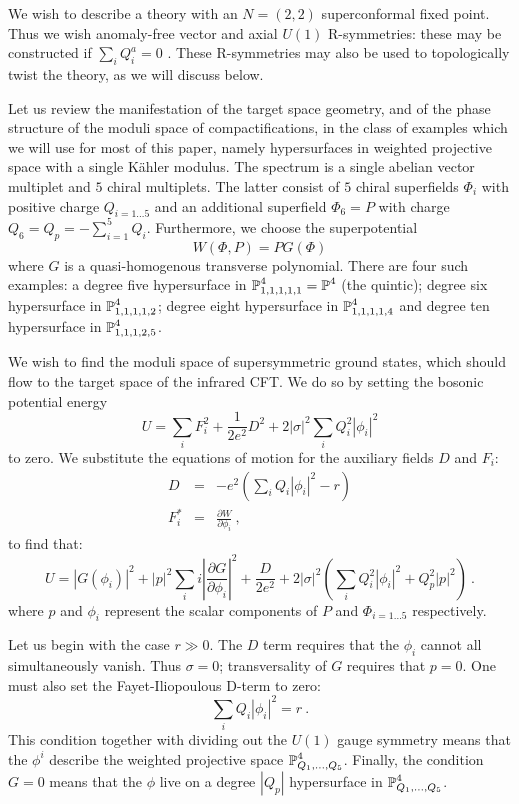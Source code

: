 \documentclass[a4paper,12pt]{article}
\begin{document}
We wish to describe a theory with an $N=(2,2)$ superconformal fixed point. 
Thus we wish anomaly-free vector and axial $U(1)$ R-symmetries: these may
be constructed if $\sum_i Q_i^a = 0$ \cite{wittenphases}.  These
R-symmetries may also be used to topologically twist the theory, as we
will discuss below. 

Let us review the manifestation of the target space geometry, and of the
phase structure of the moduli space of compactifications, 
in the class of examples 
which we will use for most of this paper, namely hypersurfaces
in weighted projective space with a single K\"ahler modulus.
The spectrum is a single abelian vector multiplet and $5$ chiral
multiplets. The latter consist of $5$ chiral superfields $\Phi_i$ with
positive charge $Q_{i=1\ldots 5} $ and an additional superfield $\Phi_{6} = P$
with charge $Q_{6} = Q_p = - \sum_{i=1}^5 Q_i$. Furthermore, we choose the 
superpotential
\begin{equation}
	W(\Phi,P) = P G(\Phi)
\end{equation}
where $G$ is a quasi-homogenous  transverse polynomial. There
are four such examples:
a degree five hypersurface in $\mbox{$\mathbb P$}_{1,1,1,1,1}^4=\mbox{$\mathbb P$}^4$ 
(the quintic); degree six hypersurface in $\mbox{$\mathbb P$}_{1,1,1,1,2}^4$;
degree eight hypersurface in $\mbox{$\mathbb P$}_{1,1,1,1,4}^4$ 
and degree ten hypersurface in $\mbox{$\mathbb P$}_{1,1,1,2,5}^4$. 

We wish to find the moduli space of supersymmetric ground states, which
should flow to the target space of the infrared CFT. We do so by setting
the bosonic potential energy
\begin{equation}
U=\sum_i F_i^2+\frac{1}{2e^2}D^2+2|\sigma|^2\sum_iQ_i^2|\phi_i|^2
\label{bosonicpe}
\end{equation}
to zero.  We substitute the
equations of motion for
the auxiliary fields $D$ and $F_i$:
\begin{eqnarray}
D&=&-e^2\left(\sum_iQ_i|\phi_i|^2-r\right)\nonumber \\
F_i^*&=&\frac{\partial W} {\partial\phi_i}\ ,
\label{dandf}
\end{eqnarray}
to find that:
\begin{equation}
U=|G(\phi_i)|^2+|p|^2\sum_ii\left|
\frac{\partial G}{\partial \phi_i}\right|^2+
\frac{D}{2e^2}+2|\sigma|^2
\left(\sum_iQ_i^2|\phi_i|^2+Q_p^2|p|^2\right)\ .
\label{bosonicpe1}
\end{equation}
where $p$ and $\phi_i$ represent the 
scalar components of $P$ and $\Phi_{i=1\ldots 5}$
respectively.

Let us begin with the case $r\gg 0$. The $D$ term requires that the
$\phi_i$ cannot all simultaneously vanish. Thus $\sigma = 0$;
transversality of $G$ requires that $p=0$. One must also set the
Fayet-Iliopoulous D-term to zero: 
\begin{equation}
\sum_iQ_i|\phi_i|^2=r\ .
\end{equation}
This condition together with dividing out the $U(1)$ gauge symmetry means
that the $\phi^i$ describe the weighted projective space
$\mbox{$\mathbb P$}_{Q_1,\ldots,Q_5}^{4}$.  Finally, the condition
$G=0$ means that the $\phi$ live on a degree $|Q_p|$ hypersurface in
$\mbox{$\mathbb P$}_{Q_1,\ldots,Q_5}^{4}$.
\end{document}
